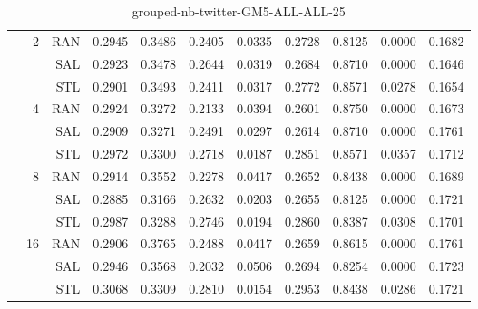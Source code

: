 \begin{center}
\begin{table}[htbp]
\begin{center}
\begin{tabular}{ | r | r | r | r | r | r | r | r | r | r | r |}
 & \multirow{3}{*}{2} & RAN & 0.2945 & 0.3486 & 0.2405 & 0.0335 & 0.2728 & 0.8125 & 0.0000 & 0.1682\\ \cline{3-11}
 &   & SAL & 0.2923 & 0.3478 & 0.2644 & 0.0319 & 0.2684 & 0.8710 & 0.0000 & 0.1646\\ \cline{3-11}
 &   & STL & 0.2901 & 0.3493 & 0.2411 & 0.0317 & 0.2772 & 0.8571 & 0.0278 & 0.1654\\ \cline{2-11}
 & \multirow{3}{*}{4} & RAN & 0.2924 & 0.3272 & 0.2133 & 0.0394 & 0.2601 & 0.8750 & 0.0000 & 0.1673\\ \cline{3-11}
 &   & SAL & 0.2909 & 0.3271 & 0.2491 & 0.0297 & 0.2614 & 0.8710 & 0.0000 & 0.1761\\ \cline{3-11}
 &   & STL & 0.2972 & 0.3300 & 0.2718 & 0.0187 & 0.2851 & 0.8571 & 0.0357 & 0.1712\\ \cline{2-11}
 & \multirow{3}{*}{8} & RAN & 0.2914 & 0.3552 & 0.2278 & 0.0417 & 0.2652 & 0.8438 & 0.0000 & 0.1689\\ \cline{3-11}
 &   & SAL & 0.2885 & 0.3166 & 0.2632 & 0.0203 & 0.2655 & 0.8125 & 0.0000 & 0.1721\\ \cline{3-11}
 &   & STL & 0.2987 & 0.3288 & 0.2746 & 0.0194 & 0.2860 & 0.8387 & 0.0308 & 0.1701\\ \cline{2-11}
 & \multirow{3}{*}{16} & RAN & 0.2906 & 0.3765 & 0.2488 & 0.0417 & 0.2659 & 0.8615 & 0.0000 & 0.1761\\ \cline{3-11}
 &   & SAL & 0.2946 & 0.3568 & 0.2032 & 0.0506 & 0.2694 & 0.8254 & 0.0000 & 0.1723\\ \cline{3-11}
 &   & STL & 0.3068 & 0.3309 & 0.2810 & 0.0154 & 0.2953 & 0.8438 & 0.0286 & 0.1721\\ \cline{2-11}
\hline
\end{tabular}
\caption{grouped-nb-twitter-GM5-ALL-ALL-25}
\end{center}
 \end{table}
\end{center}

